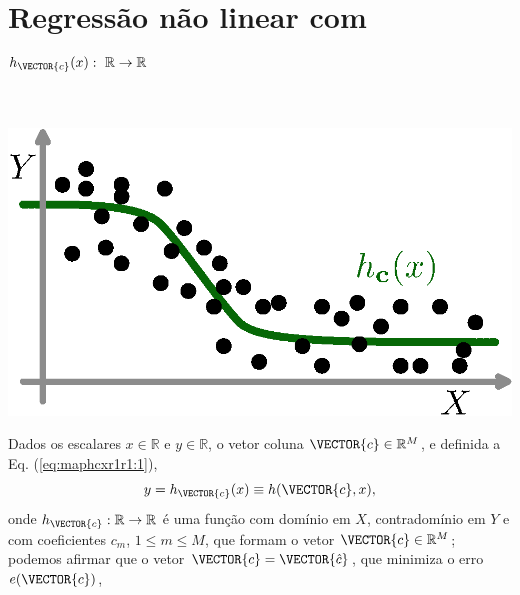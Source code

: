 \section{Regressão não linear com $h_{\VECTOR{c}}(x):~\mathbb{R} \rightarrow \mathbb{R}$ }
\label{sec:theo:maphcxr1r1}



\begin{theorem}
\label{theo:maphcxr1r1}
~\\
\begin{minipage}{0.4\textwidth}
\centering
\includegraphics[width=0.95\linewidth]{chapters/mapeamento/mapeamento-hx-nonlinear.eps} 
\end{minipage}
\begin{minipage}{0.6\textwidth}
Dados
os escalares $x \in \mathbb{R}$ e $y \in \mathbb{R}$, o vetor coluna $\VECTOR{c} \in \mathbb{R}^M$, e 
definida a Eq. (\ref{eq:maphcxr1r1:1}), 
\begin{equation}\label{eq:maphcxr1r1:1}
y=h_{\VECTOR{c}}(x)\equiv h(\VECTOR{c},x),
\end{equation}
onde $h_{\VECTOR{c}}:\mathbb{R} \rightarrow \mathbb{R}$ é uma função com domínio em $X$, contradomínio em $Y$
e com coeficientes $c_m$, $1 \leq m \leq M$, que formam o vetor $\VECTOR{c} \in \mathbb{R}^{M}$;
podemos afirmar que o vetor $\VECTOR{c}=\VECTOR{\hat{c}}$,
que minimiza o erro $e(\VECTOR{c})$,
\end{minipage}


\end{theorem}
